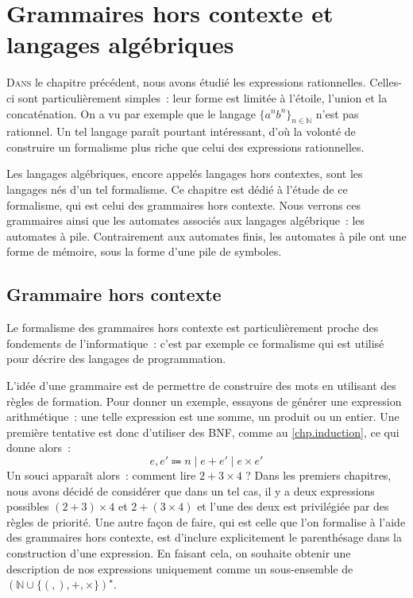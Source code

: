 \chapter[Langages algébriques]{Grammaires hors contexte et langages algébriques}
\label{chp.alg}

\minitoc

\lettrine{D}{ans} le chapitre précédent, nous avons étudié les expressions
rationnelles. Celles-ci sont particulièrement simples~: leur forme est limitée
à l'étoile, l'union et la concaténation. On a vu par exemple que le langage
$\{a^nb^n\}_{n\in\mathbb N}$ n'est pas rationnel. Un tel langage paraît pourtant
intéressant, d'où la volonté de construire un formalisme plus riche que celui
des expressions rationnelles.

Les langages algébriques, encore appelés langages hors contextes, sont les
langages nés d'un tel formalisme. Ce chapitre est dédié à l'étude de ce
formalisme, qui est celui des grammaires hors contexte. Nous verrons ces
grammaires ainsi que les automates associés aux langages algébrique~: les
automates à pile. Contrairement aux automates finis, les automates à pile ont
une forme de mémoire, sous la forme d'une pile de symboles.

\section{Grammaire hors contexte}\label{sec.alg1}

Le formalisme des grammaires hors contexte est particulièrement proche des
fondements de l'informatique~: c'est par exemple ce formalisme qui est utilisé
pour décrire des langages de programmation.

L'idée d'une grammaire est de permettre de construire des mots en utilisant des
règles de formation. Pour donner un exemple, essayons de générer une expression
arithmétique~: une telle expression est une somme, un produit ou un entier. Une
première tentative est donc d'utiliser des BNF, comme au \cref{chp.induction},
ce qui donne alors~:
\[e,e' \Coloneq n \mid e + e' \mid e \times e'\]
Un souci apparaît alors~: comment lire $2 + 3 \times 4$ ? Dans les premiers
chapitres, nous avons décidé de considérer que dans un tel cas, il y a deux
expressions possibles $(2 + 3) \times 4$ et $2 + (3 \times 4)$ et l'une des deux
est privilégiée par des règles de priorité. Une autre façon de faire, qui est
celle que l'on formalise à l'aide des grammaires hors contexte, est d'inclure
explicitement le parenthésage dans la construction d'une expression. En faisant
cela, on souhaite obtenir une description de nos expressions uniquement comme
un sous-ensemble de $(\mathbb N \cup \{(,),+,\times\})^\star$.

